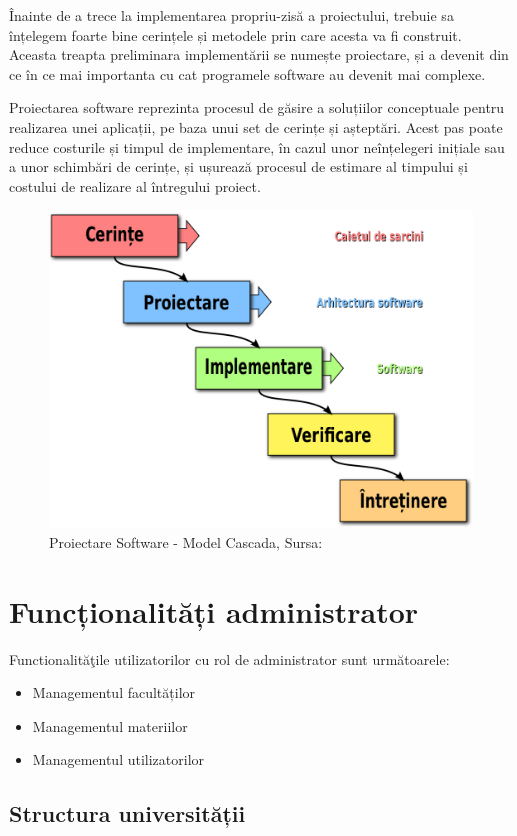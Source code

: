 \documentclass[12pt, a4paper, oneside, romanian]{teza-upb}
\begin{document}
Înainte de a trece la implementarea propriu-zisă a proiectului, trebuie sa înțelegem foarte bine cerințele și metodele prin care acesta va fi construit. Aceasta treapta preliminara implementării se numește proiectare, și a devenit din ce în ce mai importanta cu cat programele software au devenit mai complexe.

Proiectarea software reprezinta procesul de găsire a soluțiilor conceptuale pentru realizarea unei aplicații, pe baza unui set de cerințe și așteptări. Acest pas poate reduce costurile și timpul de implementare, în cazul unor neînțelegeri inițiale sau a unor schimbări de cerințe, și ușurează procesul de estimare al timpului și costului de realizare al întregului proiect.

\begin{figure}[H]
\centering
\includegraphics*[width=0.55\columnwidth]{proiectare-software-model-cascada}
\caption{Proiectare Software - Model Cascada, Sursa: \cite{proiectaresoftwaremodelcascada}}
\label{proiectare-software-model-cascada}
\end{figure}

\section{Funcționalități administrator}

Functionalităţile utilizatorilor cu rol de administrator sunt următoarele:
\begin{itemize}
	\item Managementul facultăților
	\item Managementul materiilor
	\item Managementul utilizatorilor
\end{itemize}

\subsection{Structura universității}
\end{document}
